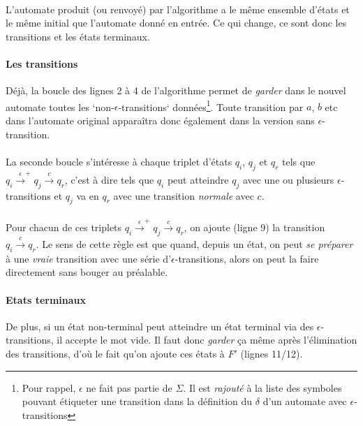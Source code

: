 \documentclass{article}[11pt]
\theoremstyle{definition}
\begin{document}
\paragraph*{}L'automate produit (ou renvoyé) par l'algorithme a le même ensemble d'états et le même initial que l'automate donné en entrée. Ce qui change, ce sont donc les transitions et les états terminaux.

\paragraph*{Les transitions} Déjà, la boucle des lignes 2 à 4 de l'algorithme permet de \textit{garder} dans le nouvel automate toutes les `non-$\epsilon$-transitions` données\footnote{Pour rappel, $\epsilon$ ne fait pas partie de $\Sigma$. Il est \textit{rajouté} à la liste des symboles pouvant étiqueter une transition dans la définition du $\delta$ d'un automate avec $\epsilon$-transitions}. Toute transition par $a$, $b$ etc dans l'automate original apparaîtra donc également dans la version sans $\epsilon$-transition. 

\paragraph*{}La seconde boucle s'intéresse à chaque triplet d'états $q_i$, $q_j$ et $q_r$ tels que $q_i \xrightarrow{\epsilon}^+ q_j \xrightarrow{c} q_r$, c'est à dire tels que $q_i$ peut atteindre $q_j$ avec une ou plusieurs $\epsilon$-transitions et $q_j$ va en $q_r$ avec une transition \textit{normale} avec $c$. 

\paragraph*{}Pour chacun de ces triplets $q_i \xrightarrow{\epsilon}^+ q_j \xrightarrow{c} q_r$, on ajoute (ligne 9) la transition $q_i \xrightarrow{c} q_r$. Le sens de cette règle est que quand, depuis un état, on peut \textit{se préparer} à une \textit{vraie} transition avec une série d'$\epsilon$-transitions, alors on peut la faire directement sans bouger au préalable. 

\paragraph*{Etats terminaux}De plus, si un état non-terminal peut atteindre un état terminal via des $\epsilon$-transitions, il accepte le mot vide. Il faut donc \textit{garder} ça même après l'élimination des transitions, d'où le fait qu'on ajoute ces états à $F'$ (lignes 11/12).
\end{document}

